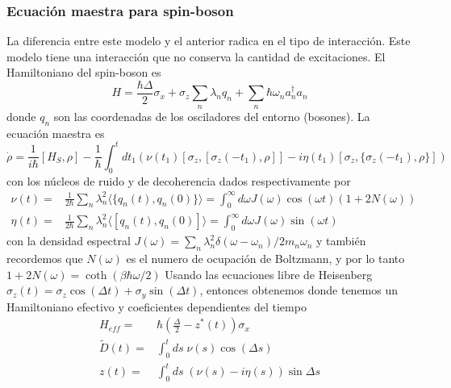 \subsubsection{Ecuación maestra para spin-boson}
La diferencia entre este modelo y el anterior radica en el tipo de interacción. Este modelo tiene una interacción que no conserva la cantidad de excitaciones. El Hamiltoniano del spin-boson es
\begin{equation}
    H=\frac{\hbar\Delta}{2}\sigma_x+\sigma_z\sum_n\lambda_nq_n+\sum_n\hbar\omega_na_n^\dagger a_n
\end{equation}
donde $q_n$ son las coordenadas de los osciladores del entorno (bosones). La ecuación maestra es
\begin{equation}
    \dot\rho =\frac{1}{i\hbar}[H_S,\rho]-\frac{1}{\hbar}\int_0^tdt_1\left( \nu(t_1)[\sigma_z,[\sigma_z(-t_1),\rho]]-i\eta(t_1)[\sigma_z,\{\sigma_z(-t_1),\rho\}] \right)
\end{equation}
con los núcleos de ruido y de decoherencia dados respectivamente por
\begin{equation}
    \begin{aligned}
        \nu(t)=& \frac{1}{2\hbar}\sum_n\lambda_n^2\langle\{q_n(t),q_n(0)\}\rangle=\int_0^\infty d\omega J(\omega)\cos(\omega t)(1+2N(\omega))\\
        \eta(t) = & \frac{1}{2\hbar}\sum_n\lambda_n^2\langle[q_n(t),q_n(0)]\rangle=\int_0^\infty d\omega J(\omega)\sin(\omega t)
    \end{aligned}
\end{equation}
con la densidad espectral $J(\omega)=\sum_n\lambda_n^2\delta(\omega-\omega_n)/2m_n\omega_n$ y también recordemos que $N(\omega)$ es el numero de ocupación de Boltzmann,  y por lo tanto $1+2N(\omega)=\coth(\beta\hbar\omega/2)$
Usando las ecuaciones libre de Heisenberg $\sigma_z(t)=\sigma_z\cos(\Delta t)+\sigma_y\sin(\Delta t)$, entonces obtenemos
donde tenemos un Hamiltoniano efectivo y coeficientes dependientes del tiempo
\begin{equation}
    \begin{aligned}
        H_{eff}=&\hbar\left(\frac{\Delta}{2}-z^*(t)\right)\sigma_x \\
        \tilde D(t) =&\int_0^tds\;\nu(s)\cos(\Delta s) \\
        z(t) = & \int_0^tds\;(\nu(s)-i\eta(s))\sin\Delta s
    \end{aligned}
\end{equation}

